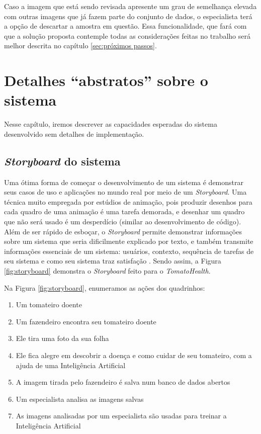 Caso a imagem que está sendo revisada apresente um grau de semelhança elevada com outras imagens que já fazem parte do conjunto de dados, o especialista terá a opção de descartar a amostra em questão. Essa funcionalidade, que fará com que a solução proposta contemple todas as considerações feitas no trabalho será melhor descrita no capítulo \ref{sec:próximos passos}.

\section{{Detalhes ``abstratos'' sobre o sistema} \label{sec:abst-det}}

Nesse capítulo, iremos descrever as capacidades esperadas do sistema desenvolvido sem detalhes de implementação.

\subsection{{\textit{Storyboard} do sistema}}

Uma ótima forma de começar o desenvolvimento de um sistema é demonstrar seus casos de uso e aplicações no mundo real por meio de um \textit{Storyboard}. Uma técnica muito empregada por estúdios de animação, pois produzir desenhos para cada quadro de uma animação é uma tarefa demorada, e desenhar um quadro que não será usado é um desperdício (similar ao desenvolvimento de código). Além de ser rápido de esboçar, o \textit{Storyboard} permite demonstrar informações sobre um sistema que seria dificilmente explicado por texto, e também transmite informações essenciais de um sistema: usuários, contexto, sequência de tarefas de seu sistema e como seu sistema traz satisfação \citep{klemmer2016}. Sendo assim, a Figura \ref{fig:storyboard} demonstra o \textit{Storyboard} feito para o \emph{TomatoHealth}.

Na Figura \ref{fig:storyboard}, enumeramos as ações dos quadrinhos:

\begin{enumerate}
    \item Um tomateiro doente
    \item Um fazendeiro encontra seu tomateiro doente
    \item Ele tira uma foto da sua folha
    \item Ele fica alegre em descobrir a doença e como cuidar de seu tomateiro, com a ajuda de uma Inteligência Artificial
    \item A imagem tirada pelo fazendeiro é salva num banco de dados abertos
    \item Um especialista analisa as imagens salvas
    \item As imagens analisadas por um especialista são usadas para treinar a Inteligência Artificial
\end{enumerate}

